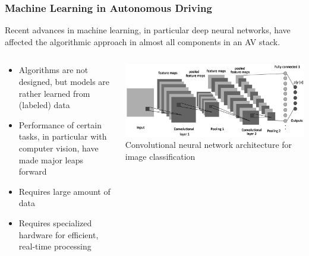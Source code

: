 {\begin{frame}
\frametitle{Machine Learning in Autonomous Driving}
Recent advances in machine learning, in particular deep neural networks, have
affected the algorithmic approach in almost all components in an AV stack.
\begin{columns}[]
    \begin{column}{0.4\textwidth}
        \begin{itemize}
            \item Algorithms are not designed, but models are rather learned
                from (labeled) data
            \item Performance of certain tasks, in particular with computer
                vision, have made major leaps forward
            \item Requires large amount of data
            \item Requires specialized hardware for efficient, real-time 
                processing
        \end{itemize}
    \end{column}
    \begin{column}{0.6\textwidth}
        \centering
        \includegraphics[width=\textwidth]{images/cnn_architecture.png}\\
        \footnotesize{Convolutional neural network architecture for image classification \cite{Albelwi2017}}
    \end{column}
\end{columns}
\end{frame}

}
